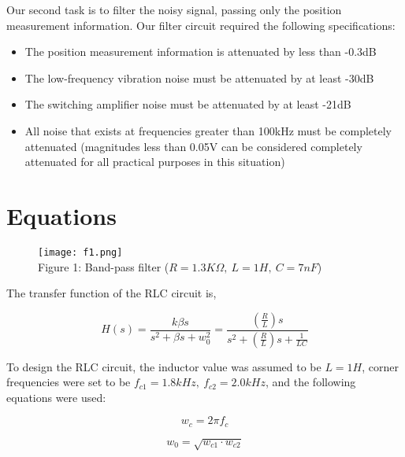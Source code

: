 \documentclass[12pt,a4paper]{article}
\begin{document}
    Our second task is to filter the noisy signal, passing only the position measurement information. Our filter circuit required the following specifications:
    
\begin{itemize}
    \item 
    The position measurement information is attenuated by less than -0.3dB\\
    
    \item
    The low-frequency vibration noise must be attenuated by at least -30dB\\

    \item
    The switching amplifier noise must be attenuated by at least -21dB\\

    \item
    All noise that exists at frequencies greater than 100kHz must be completely attenuated (magnitudes less than 0.05V can be considered completely attenuated for all practical purposes in this situation)
\end{itemize}
\clearpage

\section{Equations}\label{sec:lit-rev}

\begin{figure}[h]
    \centering
    \texttt{[image: f1.png]}
    \\Figure 1: Band-pass filter ($R = 1.3K\Omega,\ L = 1H,\ C = 7nF$)
\end{figure}\textbf{}
    The transfer function of the RLC circuit is,
    
    $$H(s) = \frac{k\beta s}{s^2 + \beta s + w_0^2} = \frac{(\frac{R}{L})s}{s^2 + (\frac{R}{L})s + \frac{1}{LC}}$$
    
    To design the RLC circuit, the inductor value was assumed to be $L = 1H$, corner frequencies were set to be $f_{c1} = 1.8kHz,\ f_{c2} = 2.0kHz$, and the following equations were used:

\begin{equation}
    w_c = 2\pi f_c
\end{equation}

\begin{equation}
    w_0 = \sqrt{w_{c1} \cdot w_{c2}}
\end{equation}
\end{document}
